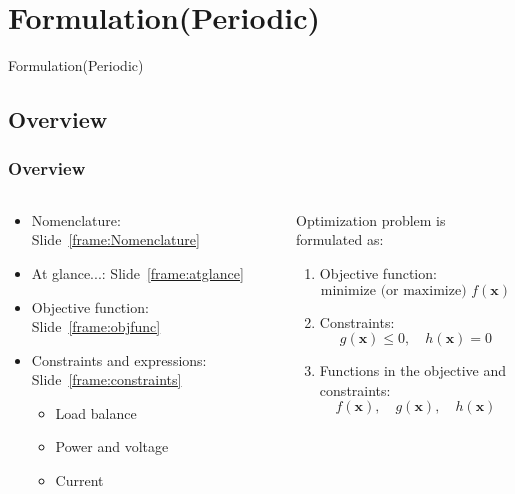 \documentclass[
	11pt, %
	aspectratio=169, %
]{beamer}
\begin{document}
\section{Formulation(Periodic)}

\begin{frame}[plain] %
	\begin{center}
		{\Huge Formulation(Periodic)}
		
		\bigskip\bigskip %
		
	\end{center}
\end{frame}


\subsection{Overview}

\begin{frame}
	\frametitle{Overview}

	\begin{columns}
	
		\begin{column}{0.5\textwidth}
			\begin{itemize}
				\item Nomenclature: Slide~\ref{frame:Nomenclature}
				\item At glance...: Slide~\ref{frame:atglance}
				\item Objective function: Slide~\ref{frame:objfunc}
				\item Constraints and expressions: Slide~\ref{frame:constraints}
					\begin{itemize}
						\item Load balance
						\item Power and voltage
						\item Current
					\end{itemize}
			\end{itemize}
		\end{column}

		\begin{column}{0.5\textwidth}
			Optimization problem is formulated as:
			\begin{enumerate}
				\item Objective function:
				\[
					\text{minimize (or maximize) } f(\mathbf{x})
				\]
				\item Constraints:
				\[
					g(\mathbf{x}) \leq 0, \quad h(\mathbf{x}) = 0
				\]
				\item Functions in the objective and constraints:
				\[
					f(\mathbf{x}), \quad g(\mathbf{x}), \quad h(\mathbf{x})
				\]
			\end{enumerate}
		\end{column}

	\end{columns}

\end{frame}
\end{document}
